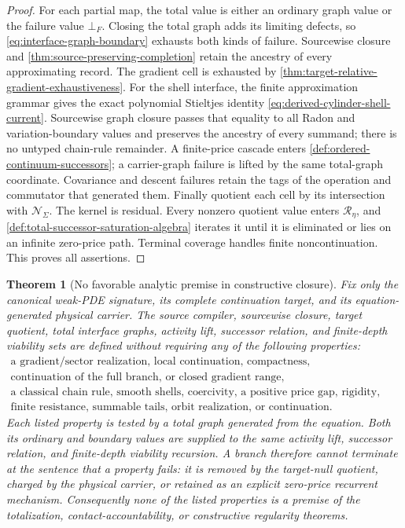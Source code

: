 \documentclass[11pt]{article}
\numberwithin{section}{part}
\theoremstyle{plain}
\newtheorem{theorem}{Theorem}[section]
\theoremstyle{definition}
\theoremstyle{remark}
\newcommand{\Null}{\mathscr N}
\begin{document}
\begin{proof}
For each partial map, the total value is either an ordinary graph value or the
failure value \(\bot_F\).  Closing the total graph adds its limiting defects,
so \eqref{eq:interface-graph-boundary} exhausts both kinds of failure.
Sourcewise closure and
\cref{thm:source-preserving-completion} retain the ancestry of every
approximating record.  The gradient cell is exhausted by
\cref{thm:target-relative-gradient-exhaustiveness}.  For the shell interface,
the finite approximation grammar gives the exact polynomial Stieltjes
identity \eqref{eq:derived-cylinder-shell-current}.  Sourcewise graph closure
passes that equality to all Radon and variation-boundary values and preserves
the ancestry of every summand; there is no untyped chain-rule remainder.  A
finite-price cascade enters
\cref{def:ordered-continuum-successors}; a carrier-graph failure is lifted by
the same total-graph coordinate.  Covariance and descent failures retain the
tags of the operation and commutator that generated them.  Finally quotient
each cell by its intersection with \(\Null_\Sigma\).  The kernel is residual.
Every nonzero quotient value enters \(\mathcal R_\eta\), and
\cref{def:total-successor-saturation-algebra} iterates it until it is
eliminated or lies on an infinite zero-price path.  Terminal coverage handles
finite noncontinuation.  This proves all assertions.
\end{proof}

\begin{theorem}[No favorable analytic premise in constructive closure]
\label{thm:no-favorable-analytic-premise}
Fix only the canonical weak-PDE signature, its complete continuation target,
and its equation-generated physical carrier.  The source compiler, sourcewise
closure, target quotient, total interface graphs, activity lift, successor
relation, and finite-depth viability sets are defined without requiring any of
the following properties:
\begin{equation}
 \label{eq:no-favorable-premise-list}
 \begin{gathered}
 \text{a gradient/sector realization, local continuation, compactness,}\\
 \text{continuation of the full branch, or closed gradient range,}\\
 \text{a classical chain rule, smooth shells, coercivity, a positive price
 gap, rigidity, polarity,}\\
 \text{finite resistance, summable tails, orbit realization, or
 continuation.}
 \end{gathered}
\end{equation}
Each listed property is tested by a total graph generated from the equation.
Both its ordinary and boundary values are supplied to the same activity lift,
successor relation, and finite-depth viability recursion.  A branch therefore
cannot terminate at the sentence that a property fails: it is removed by the
target-null quotient, charged by the physical carrier, or retained as an
explicit zero-price recurrent mechanism.  Consequently none of the listed
properties is a premise of the totalization, contact-accountability, or
constructive regularity theorems.
\end{theorem}
\end{document}
